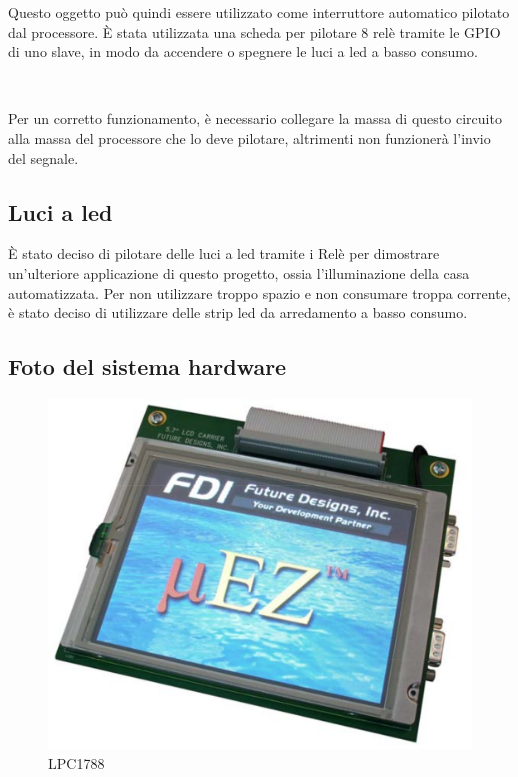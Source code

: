 \documentclass[a4paper,titlepage]{book}
\begin{document}
Questo oggetto può quindi essere utilizzato come interruttore automatico pilotato dal processore. È stata utilizzata una scheda per pilotare 8 relè tramite le GPIO di uno slave, in modo da accendere o spegnere le luci a led a basso consumo.

~

Per un corretto funzionamento, è necessario collegare la massa di questo circuito alla massa del processore che lo deve pilotare, altrimenti non funzionerà l'invio del segnale.

\subsection{Luci a led}

È stato deciso di pilotare delle luci a led tramite i Relè per dimostrare un'ulteriore applicazione di questo progetto, ossia l'illuminazione della casa automatizzata. Per non utilizzare troppo spazio e non consumare troppa corrente, è stato deciso di utilizzare delle strip led da arredamento a basso consumo. 

\subsection{Foto del sistema hardware}

\begin{figure}[!h]
\centering
\includegraphics[scale=1]{lpc1788.png}
\caption{LPC1788}
\end{figure}
\end{document}
